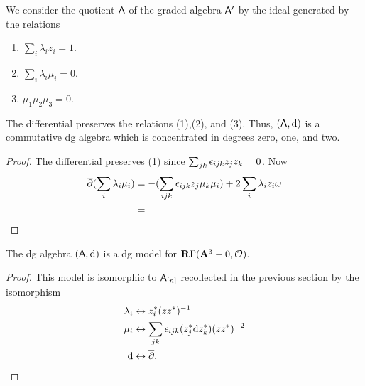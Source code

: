 \documentclass[11pt]{amsart}
\begin{document}
We consider the quotient $\mathsf A$ of the graded algebra $\mathsf A'$ by the ideal generated by the relations
\begin{enumerate}
\item $\sum_i \lambda_i z_i = 1$.
\item $\sum_i \lambda_i \mu_i = 0$.
\item $\mu_1 \mu_2 \mu_3 = 0$. 
\end{enumerate}

\begin{lem}
The differential preserves the relations (1),(2), and (3).
Thus, $(\mathsf A, {\rm d})$ is a commutative dg algebra which is concentrated in degrees zero, one, and two.
\end{lem}
\begin{proof}
The differential preserves (1) since $\sum_{jk} {\epsilon}_{ijk} z_j z_k = 0$.
Now
\begin{align*}
\overline{\partial}( \sum_i \lambda_i \mu_i ) & = - (\sum_{ijk} {\epsilon}_{ijk} z_j \mu_k \mu_i) + 2\sum_i \lambda_i z_i \omega \\
& = 
\end{align*} 
\end{proof}



\begin{prop}
The dg algebra $(\mathsf A,{\rm d})$ is a dg model for $\mathbf{R} \Gamma({\mathbf{A}}^3 - 0, \mathcal O)$.
\end{prop}
\begin{proof}
This model is isomorphic to $\mathsf A_{[n]}$ recollected in the previous section by the isomorphism
\begin{align*}
\lambda_i & \leftrightarrow z_i^* (zz^*)^{-1} \\
\mu_i & \leftrightarrow \sum_{jk} {\epsilon}_{ijk} (z_j^* {\rm d} z_k^*) (z z^*)^{-2}  \\
{\rm d} & \leftrightarrow \overline{\partial} .
\end{align*}

\end{proof}
\end{document}
